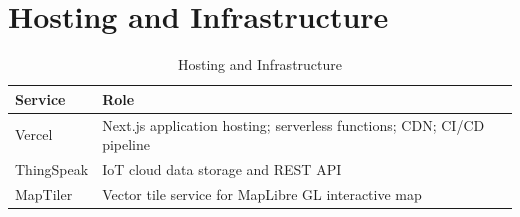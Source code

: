 \section{Hosting and Infrastructure}

\begin{table}[H]
\centering
\caption{Hosting and Infrastructure}
\begin{tabularx}{\linewidth}{|l|X|}
\hline
\rowcolor{FloodLight}
\textbf{Service} & \textbf{Role} \\
\hline
Vercel & Next.js application hosting; serverless functions; CDN; CI/CD pipeline \\
ThingSpeak & IoT cloud data storage and REST API \\
MapTiler & Vector tile service for MapLibre GL interactive map \\
\hline
\end{tabularx}
\end{table}
